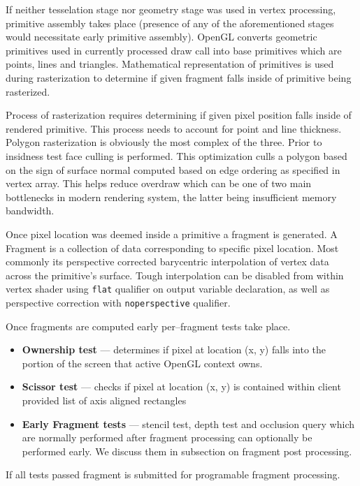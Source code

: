 If neither tesselation stage nor geometry stage was used in vertex processing, primitive assembly takes place (presence of any of the aforementioned stages would necessitate early primitive assembly). 
OpenGL converts geometric primitives used in currently processed draw call into base primitives which are points, lines and triangles.
Mathematical representation of primitives is used during rasterization to determine if given fragment falls inside of primitive being rasterized.

Process of rasterization requires determining if given pixel position falls inside of rendered primitive. This process needs to account for point and line thickness.
Polygon rasterization is obviously the most complex of the three. Prior to insidness test face culling is performed. 
This optimization culls a polygon based on the sign of surface normal computed based on edge ordering as specified in vertex array.
This helps reduce overdraw which can be one of two main bottlenecks in modern rendering system, the latter being insufficient memory bandwidth.

Once pixel location was deemed inside a primitive a fragment is generated. 
A Fragment is a collection of data corresponding to specific pixel location.
Most commonly its perspective corrected barycentric interpolation of vertex data across the primitive's surface.
Tough interpolation can be disabled from within vertex shader using \texttt{flat} qualifier on output variable declaration,
as well as perspective correction with \texttt{noperspective} qualifier.

Once fragments are computed early per--fragment tests take place.

\begin{itemize}
    \item \textbf{Ownership test} --- determines if pixel at location (x, y) falls into the portion of the screen that active OpenGL context owns.
    \item \textbf{Scissor test} --- checks if pixel at location (x, y) is contained within client provided list of axis aligned rectangles
    \item \textbf{Early Fragment tests} --- stencil test, depth test and occlusion query which are normally performed after fragment processing can optionally be performed early. We discuss them in subsection on fragment post processing.
\end{itemize}

If all tests passed fragment is submitted for programable fragment processing.

